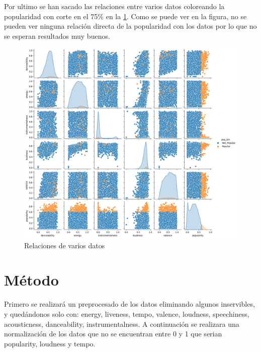 \documentclass{wsdcr}
\begin{document}
Por ultimo se han sacado las relaciones entre varios datos coloreando la popularidad con corte en el 75\% en la \figurename{\ref{fig:relaciones}}. Como se puede ver en la figura, no se pueden ver ninguna relación directa de la popularidad con los datos por lo que no se esperan resultados muy buenos.
\begin{figure}[H] \includegraphics[width=\columnwidth]{images/Relaciones.png} \caption{Relaciones de varios datos} \label{fig:relaciones} \end{figure}




\section{Método}
Primero se realizará un preprocesado de los datos eliminando algunos inservibles, y quedándonos solo con: energy, liveness, tempo, valence, loudness, speechiness, acousticness, danceability, instrumentalness. A continuación se realizara una normalización de los datos que no se encuentran entre 0 y 1 que serian popularity, loudness y tempo.
\end{document}
